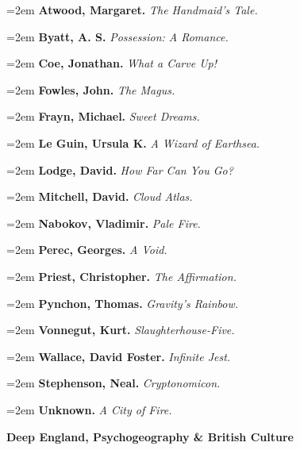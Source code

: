 \par\noindent\hangindent=2em {\bf Atwood, Margaret.} {\it The Handmaid's Tale.} \par
\par\noindent\hangindent=2em {\bf Byatt, A. S.} {\it Possession: A Romance.} \par
\par\noindent\hangindent=2em {\bf Coe, Jonathan.} {\it What a Carve Up!} \par
\par\noindent\hangindent=2em {\bf Fowles, John.} {\it The Magus.} \par
\par\noindent\hangindent=2em {\bf Frayn, Michael.} {\it Sweet Dreams.} \par
\par\noindent\hangindent=2em {\bf Le Guin, Ursula K.} {\it A Wizard of Earthsea.} \par
\par\noindent\hangindent=2em {\bf Lodge, David.} {\it How Far Can You Go?} \par
\par\noindent\hangindent=2em {\bf Mitchell, David.} {\it Cloud Atlas.} \par
\par\noindent\hangindent=2em {\bf Nabokov, Vladimir.} {\it Pale Fire.} \par
\par\noindent\hangindent=2em {\bf Perec, Georges.} {\it A Void.} \par
\par\noindent\hangindent=2em {\bf Priest, Christopher.} {\it The Affirmation.} \par
\par\noindent\hangindent=2em {\bf Pynchon, Thomas.} {\it Gravity's Rainbow.} \par
\par\noindent\hangindent=2em {\bf Vonnegut, Kurt.} {\it Slaughterhouse-Five.} \par
\par\noindent\hangindent=2em {\bf Wallace, David Foster.} {\it Infinite Jest.} \par
\par\noindent\hangindent=2em {\bf Stephenson, Neal.} {\it Cryptonomicon.} \par
\par\noindent\hangindent=2em {\bf Unknown.} {\it A City of Fire.} \par

\bigskip
{\bf Deep England, Psychogeography \& British Culture} \par\smallskip

